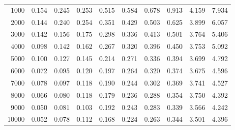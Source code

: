\documentclass{sig-alternate}
\newcommand{\mycomputer}{2.66~Ghz Intel i7\xspace}
\begin{document}
\begin{table*}
\begin{small}
\begin{tabular}{|r||r|r|r|r|r|r|r|r|r|}
\hline
 1000 & 0.154 & 0.245 & 0.253 & 0.515 & 0.584 & 0.678 & 0.913 & 4.159 & 7.934\\
 2000 & 0.144 & 0.240 & 0.254 & 0.351 & 0.429 & 0.503 & 0.625 & 3.899 & 6.057\\
 3000 & 0.142 & 0.156 & 0.175 & 0.298 & 0.336 & 0.413 & 0.501 & 3.764 & 5.406\\
 4000 & 0.098 & 0.142 & 0.162 & 0.267 & 0.320 & 0.396 & 0.450 & 3.753 & 5.092\\
 5000 & 0.100 & 0.127 & 0.145 & 0.214 & 0.271 & 0.336 & 0.394 & 3.699 & 4.792\\
 6000 & 0.072 & 0.095 & 0.120 & 0.197 & 0.264 & 0.320 & 0.374 & 3.675 & 4.596\\
 7000 & 0.078 & 0.097 & 0.118 & 0.190 & 0.244 & 0.302 & 0.369 & 3.741 & 4.527\\
 8000 & 0.066 & 0.080 & 0.118 & 0.179 & 0.236 & 0.288 & 0.354 & 3.750 & 4.392\\
 9000 & 0.050 & 0.081 & 0.103 & 0.192 & 0.243 & 0.283 & 0.339 & 3.566 & 4.242\\
10000 & 0.052 & 0.078 & 0.112 & 0.168 & 0.224 & 0.263 & 0.344 & 3.501 & 4.396\\
\hline
\end{tabular}
\end{small}
\caption{Gaussian elimination on \mycomputer}
\label{tab:moreelim}
\end{table*}



\end{document}
